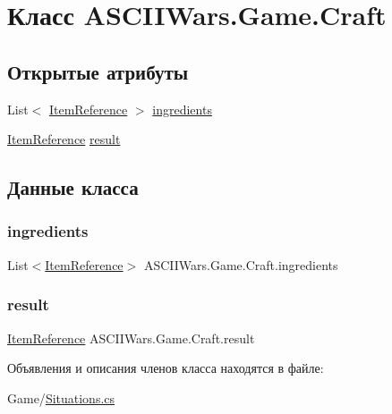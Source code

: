 \hypertarget{class_a_s_c_i_i_wars_1_1_game_1_1_craft}{}\section{Класс A\+S\+C\+I\+I\+Wars.\+Game.\+Craft}
\label{class_a_s_c_i_i_wars_1_1_game_1_1_craft}
\subsection*{Открытые атрибуты}
\begin{DoxyCompactItemize}
\item 
List$<$ \hyperlink{class_a_s_c_i_i_wars_1_1_game_1_1_item_reference}{Item\+Reference} $>$ \hyperlink{class_a_s_c_i_i_wars_1_1_game_1_1_craft_a6b86d118ec73cfaa9f14db2b427f85d6}{ingredients}
\item 
\hyperlink{class_a_s_c_i_i_wars_1_1_game_1_1_item_reference}{Item\+Reference} \hyperlink{class_a_s_c_i_i_wars_1_1_game_1_1_craft_a536acdce2b02e8d23fb9c3472380ad9e}{result}
\end{DoxyCompactItemize}


\subsection{Данные класса}
\hypertarget{class_a_s_c_i_i_wars_1_1_game_1_1_craft_a6b86d118ec73cfaa9f14db2b427f85d6}{}\label{class_a_s_c_i_i_wars_1_1_game_1_1_craft_a6b86d118ec73cfaa9f14db2b427f85d6} 
\subsubsection{\texorpdfstring{ingredients}{ingredients}}
{\footnotesize\ttfamily List$<$\hyperlink{class_a_s_c_i_i_wars_1_1_game_1_1_item_reference}{Item\+Reference}$>$ A\+S\+C\+I\+I\+Wars.\+Game.\+Craft.\+ingredients}

\hypertarget{class_a_s_c_i_i_wars_1_1_game_1_1_craft_a536acdce2b02e8d23fb9c3472380ad9e}{}\label{class_a_s_c_i_i_wars_1_1_game_1_1_craft_a536acdce2b02e8d23fb9c3472380ad9e} 
\subsubsection{\texorpdfstring{result}{result}}
{\footnotesize\ttfamily \hyperlink{class_a_s_c_i_i_wars_1_1_game_1_1_item_reference}{Item\+Reference} A\+S\+C\+I\+I\+Wars.\+Game.\+Craft.\+result}



Объявления и описания членов класса находятся в файле\+:\begin{DoxyCompactItemize}
\item 
Game/\hyperlink{_situations_8cs}{Situations.\+cs}\end{DoxyCompactItemize}

